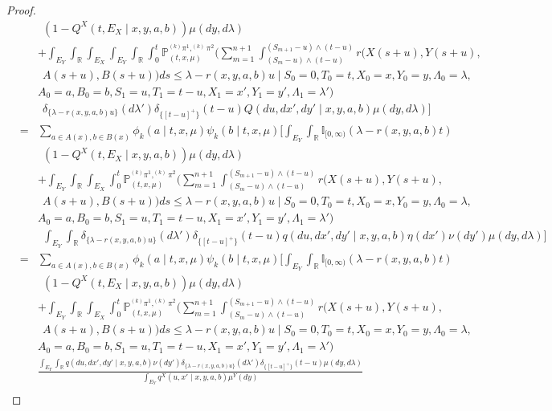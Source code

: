 \documentclass[12pt]{article}
\begin{document}
\begin{proof}
\begin{eqnarray*}
&&~~(1-Q^X(t,E_X\mid x,y,a,b))\mu(dy,d\lambda)\\
&&+\int_{E_Y}\int_{\mathbb{R}}\int_{E_X}\int_{E_Y}\int_{\mathbb{R}}\int_0^t
\mathbb{P}^{^{(k)}\pi^1,^{(k)}\pi^2}_{(t,x,\mu)}
(\sum_{m=1}^{n+1}\int_{(S_m-u)\wedge (t-u)}^{(S_{m+1}-u)\wedge (t-u)} r(X(s+u),Y(s+u),\\
&&~~A(s+u),B(s+u))ds\leq \lambda-r(x,y,a,b)u\mid S_0=0,T_0=t,X_0=x,Y_0=y,\Lambda_0=\lambda,\\
&&A_0=a,B_0=b,S_1=u,T_1=t-u,X_1=x',Y_1=y',\Lambda_1=\lambda')\\
&&~~\delta_{\{\lambda-r(x,y,a,b)u\}}(d\lambda')\delta_{\{[t-u]^+\}}(t-u)Q(du,dx',dy'\mid x,y,a,b)\mu(dy,d\lambda)\bigg]\\
&=&\sum_{a\in A(x), b\in B(x)}\phi_k(a\mid t,x,\mu)\psi_k(b\mid t,x,\mu)
\bigg[\int_{E_Y}\int_{\mathbb{R}}\mathbb{I}_{[0,\infty)}(\lambda-r(x,y,a,b)t)\\
&&~~(1-Q^X(t,E_X\mid x,y,a,b))\mu(dy,d\lambda)\\
&&+\int_{E_Y}\int_{\mathbb{R}}\int_{E_X}\int_0^t
\mathbb{P}^{^{(k)}\pi^1,^{(k)}\pi^2}_{(t,x,\mu)}(\sum_{m=1}^{n+1}\int_{(S_m-u)\wedge (t-u)}^{(S_{m+1}-u)\wedge (t-u)} r(X(s+u),Y(s+u),\\
&&~~A(s+u),B(s+u))ds\leq \lambda-r(x,y,a,b)u\mid S_0=0,T_0=t,X_0=x,Y_0=y,\Lambda_0=\lambda,\\
&&A_0=a,B_0=b,S_1=u,T_1=t-u,X_1=x',Y_1=y',\Lambda_1=\lambda')\\
&&~~\int_{E_Y}\int_{\mathbb{R}}\delta_{\{\lambda-r(x,y,a,b)u\}}(d\lambda')
\delta_{\{[t-u]^+\}}(t-u)q(du,dx',dy'\mid x,y,a,b)\eta(dx')\nu(dy')\mu(dy,d\lambda)\bigg]\\
&=&\sum_{a\in A(x), b\in B(x)}\phi_k(a\mid t,x,\mu)\psi_k(b\mid t,x,\mu)
\bigg[\int_{E_Y}\int_{\mathbb{R}}\mathbb{I}_{[0,\infty)}(\lambda-r(x,y,a,b)t)\\
&&~~(1-Q^X(t,E_X\mid x,y,a,b))\mu(dy,d\lambda)\\
&&+\int_{E_Y}\int_{\mathbb{R}}\int_{E_X}\int_0^t
\mathbb{P}^{^{(k)}\pi^1,^{(k)}\pi^2}_{(t,x,\mu)}(\sum_{m=1}^{n+1}\int_{(S_m-u)\wedge (t-u)}^{(S_{m+1}-u)\wedge (t-u)} r(X(s+u),Y(s+u),\\
&&~~A(s+u),B(s+u))ds\leq \lambda-r(x,y,a,b)u\mid S_0=0,T_0=t,X_0=x,Y_0=y,\Lambda_0=\lambda,\\
&&A_0=a,B_0=b,S_1=u,T_1=t-u,X_1=x',Y_1=y',\Lambda_1=\lambda')\\
&&\frac{\int_{E_Y}\int_{\mathbb{R}}q(du,dx',dy'\mid x,y,a,b)\nu(dy')\delta_{\{\lambda-r(x,y,a,b)u\}}(d\lambda')
\delta_{\{[t-u]^+\}}(t-u)\mu(dy,d\lambda)}
{\int_{E_Y}q^X(u,x'\mid x,y,a,b)\mu^Y(dy)}\\

\end{eqnarray*}
\end{proof}
\end{document}
